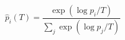 \par\needspace{70pt}\begin{minipage}{\linewidth}
\begin{equation}\widehat p_i(T)=\frac{\exp(\log p_i/T)}{\sum_j\exp(\log p_j/T)}\label{eq:13}\end{equation}
\end{minipage}\par
